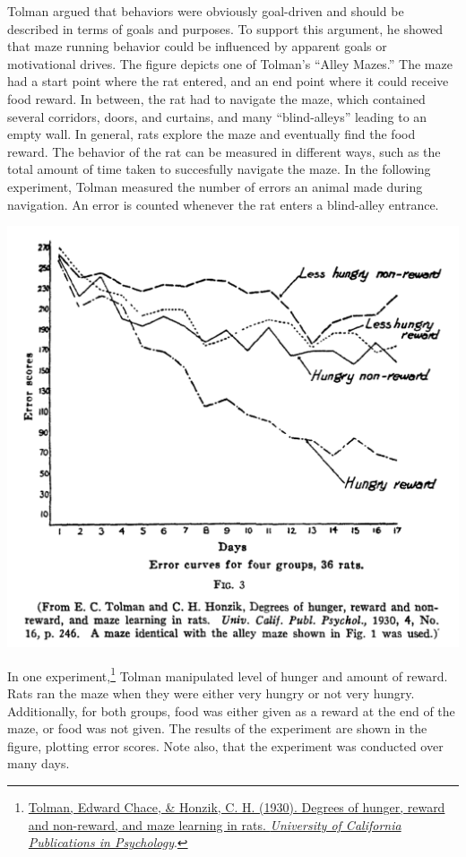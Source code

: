 \documentclass[
  oneside,
  12pt]{crumpbook}
\newenvironment{floatrightbox50}{%
  \wrapfigure{R}{.5\textwidth}%
  }{%
  \endwrapfigure}
\begin{document}
Tolman argued that behaviors were obviously goal-driven and should be described in terms of goals and purposes. To support this argument, he showed that maze running behavior could be influenced by apparent goals or motivational drives. The figure depicts one of Tolman's ``Alley Mazes.'' The maze had a start point where the rat entered, and an end point where it could receive food reward. In between, the rat had to navigate the maze, which contained several corridors, doors, and curtains, and many ``blind-alleys'' leading to an empty wall. In general, rats explore the maze and eventually find the food reward. The behavior of the rat can be measured in different ways, such as the total amount of time taken to succesfully navigate the maze. In the following experiment, Tolman measured the number of errors an animal made during navigation. An error is counted whenever the rat enters a blind-alley entrance.

\begin{floatrightbox50}
\includegraphics[width=1\linewidth]{imgs/Tolman_hunger}

\end{floatrightbox50}

In one experiment,\footnote{\protect\hyperlink{ref-tolmanDegreesHungerReward1930}{Tolman, Edward Chace, \& Honzik, C. H. (1930). Degrees of hunger, reward and non-reward, and maze learning in rats. \emph{University of California Publications in Psychology}}.} Tolman manipulated level of hunger and amount of reward. Rats ran the maze when they were either very hungry or not very hungry. Additionally, for both groups, food was either given as a reward at the end of the maze, or food was not given. The results of the experiment are shown in the figure, plotting error scores. Note also, that the experiment was conducted over many days.
\end{document}
